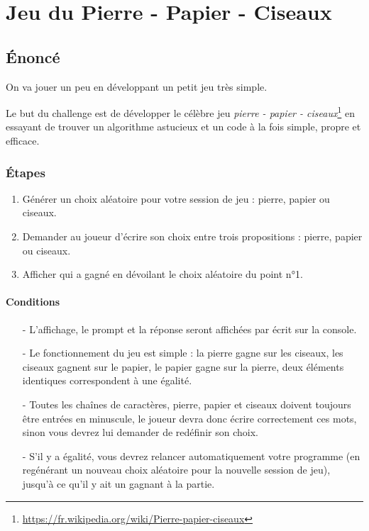 \chapter{Jeu du \og Pierre - Papier - Ciseaux\fg{}}
\vspace{2cm}
\section{Énoncé}
\medskip

On va jouer un peu en développant un petit jeu très simple.
\medskip

Le but du challenge est de développer le célèbre jeu \og \textit{pierre - papier - ciseaux}\fg{}\footnote{\url{https://fr.wikipedia.org/wiki/Pierre-papier-ciseaux}} en essayant de trouver un algorithme astucieux et un code à la fois simple, propre et efficace.
\medskip

\subsection*{Étapes}
\begin{enumerate}
	\item Générer un choix aléatoire pour votre session de jeu : \og pierre\fg{}, \og papier\fg{} ou \og ciseaux\fg{}.
	\item Demander au joueur d'écrire son choix entre trois propositions : \og pierre\fg{}, \og papier\fg{} ou \og ciseaux\fg{}.
	\item Afficher qui a gagné en dévoilant le choix aléatoire du point n°1.
\end{enumerate}
\medskip

\subsubsection*{Conditions}
\begin{itemize}
	\item[-] L'affichage, le prompt et la réponse seront affichées par écrit sur  la console.
	\item[-] Le fonctionnement du jeu est simple : la pierre gagne sur les ciseaux, les ciseaux gagnent sur le papier, le papier gagne sur la pierre, deux éléments identiques correspondent à une égalité.
	\item[-] Toutes les chaînes de caractères, \og pierre\fg{}, \og papier\fg{} et \og ciseaux\fg{} doivent toujours être entrées en minuscule, le joueur devra donc écrire correctement ces mots, sinon vous devrez lui demander de redéfinir son choix.
	\item[-] S'il y a égalité, vous devrez relancer automatiquement votre programme (en regénérant un nouveau choix aléatoire pour la nouvelle session de jeu), jusqu'à ce qu'il y ait un gagnant à la partie.
\end{itemize}
\medskip

